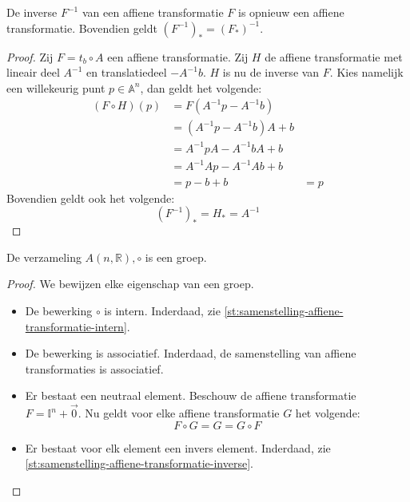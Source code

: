 \documentclass[main.tex]{subfiles}
\begin{document}
\begin{st}
  \label{st:samenstelling-affiene-transformatie-inverse}
  De inverse $F^{-1}$ van een affiene transformatie $F$ is opnieuw een affiene transformatie.
  Bovendien geldt $(F^{-1})_{*} = (F_{*})^{-1}$.

  \begin{proof}
    Zij $F = t_{b} \circ A$ een affiene transformatie.
    Zij $H$ de affiene transformatie met lineair deel $A^{-1}$ en translatiedeel $-A^{-1}b$.
    $H$ is nu de inverse van $F$.
    Kies namelijk een willekeurig punt $p\in \mathbb{A}^{n}$, dan geldt het volgende:
    \[
    \begin{array}{rll}
      (F \circ H)(p) &= F(A^{-1}p - A^{-1}b) &\\
                     &= (A^{-1}p - A^{-1}b)A + b &\\
                     &= A^{-1}pA - A^{-1}bA + b &\\
                     &= A^{-1}Ap - A^{-1}Ab + b &\\
                     &= p - b + b &= p
    \end{array}
    \]
    Bovendien geldt ook het volgende:
    \[ (F^{-1})_{*} = H_{*} = A^{-1} \]
  \end{proof}
\end{st} 

\begin{st}
  De verzameling $A(n,\mathbb{R}),\circ$ is een groep.

  \begin{proof}
    We bewijzen elke eigenschap van een groep.
    \begin{itemize}
    \item De bewerking $\circ$ is intern.
      Inderdaad, zie \ref{st:samenstelling-affiene-transformatie-intern}.
    \item De bewerking is associatief.
      Inderdaad, de samenstelling van affiene transformaties is associatief.
    \item Er bestaat een neutraal element.
      Beschouw de affiene transformatie $F = \mathbb{I}^{n} + \vec{0}$.
      Nu geldt voor elke affiene transformatie $G$ het volgende:
      \[ F \circ G = G = G \circ F \]
    \item Er bestaat voor elk element een invers element.
      Inderdaad, zie \ref{st:samenstelling-affiene-transformatie-inverse}.
    \end{itemize}
  \end{proof}
\end{st}
\end{document}
